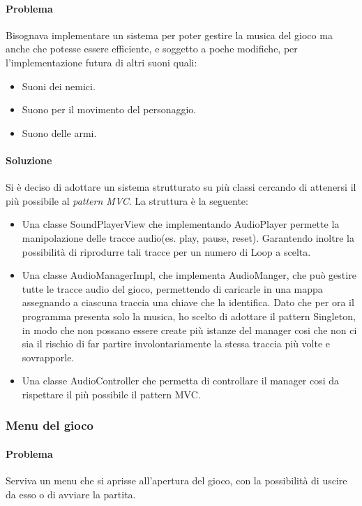 \documentclass[a4paper,12pt]{report}
\begin{document}
\paragraph{Problema}
Bisognava implementare un sistema per poter gestire la musica del gioco ma anche che potesse essere efficiente, e soggetto a poche modifiche, per l’implementazione futura di altri suoni quali: 
\begin{itemize}
    \item Suoni dei nemici.
    \item Suono per il movimento del personaggio. 
    \item Suono delle armi. 
\end{itemize}

\paragraph{Soluzione}
Si è deciso di adottare un sistema strutturato su più classi cercando di attenersi il più possibile al \textit{pattern MVC}. 
La struttura è la seguente: 
\begin{itemize}
    \item Una classe SoundPlayerView che implementando AudioPlayer permette la manipolazione delle tracce audio(es. play, pause, reset). Garantendo inoltre la possibilità di riprodurre tali tracce per un numero di Loop a scelta.
    \item Una classe AudioManagerImpl, che implementa AudioManger, che può gestire tutte le tracce audio del gioco, permettendo di caricarle in una mappa assegnando a ciascuna traccia una chiave che la identifica. Dato che per ora il programma presenta solo la musica, ho scelto di adottare il pattern Singleton, in modo che non possano essere create più istanze del manager cosi che non ci sia il rischio di far partire involontariamente la stessa traccia più volte e sovrapporle.
    \item Una classe AudioController che permetta di controllare il manager cosi da rispettare il più possibile il pattern MVC.
\end{itemize}

\subsubsection{Menu del gioco}

\paragraph{Problema}
Serviva un menu che si aprisse all’apertura del gioco, con la possibilità di uscire da esso o di avviare la partita.
\end{document}
